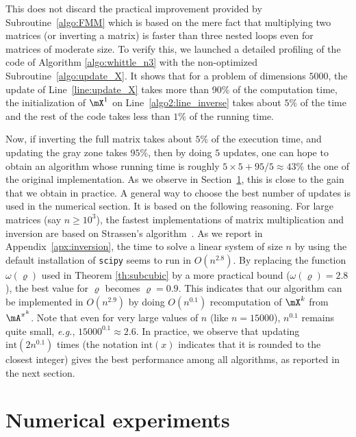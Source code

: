 This does not discard the practical improvement provided by Subroutine~\ref{algo:FMM} which is based on the mere fact that multiplying  two matrices (or inverting a matrix) is faster than three nested loops even for matrices of moderate size. To verify this, we launched  a detailed profiling of the code of Algorithm \ref{algo:whittle_n3} with the non-optimized Subroutine~\ref{algo:update_X}. It shows that for a problem of dimensions $5000$, the update of Line~\ref{line:update_X} takes more than 90\% of the computation time, the initialization of $\mX^1$ on Line~\ref{algo2:line_inverse} takes about $5\%$ of the time and the rest of the code takes less than $1\%$ of the running time.

Now, if inverting the full matrix takes about $5\%$ of the execution time, and updating the gray zone takes $95\%$, then by doing $5$ updates, one can hope to obtain an algorithm whose running time is roughly $5\times5 + 95/5\approx43\%$ the one of the original implementation. As we observe in Section~\ref{sec:numerical}, this is close to the gain that we obtain in practice. A general way to choose the best number of updates is used in the numerical section. It is based on the following reasoning. For large matrices (say $n\ge 10^3$), the fastest implementations of matrix multiplication and inversion are based on Strassen's algorithm~\cite{huang2016strassen,huang2018practical}. As we report in Appendix~\ref{apx:inversion}, the time to solve a linear system of size $n$ by using the default installation of \texttt{scipy} seems to run in $O(n^{2.8})$. By replacing the function $\omega(\varrho)$ used in Theorem \ref{th:subcubic} by a more practical bound ($\omega(\varrho)=2.8$), the best value for $\varrho$ becomes $\varrho = 0.9$. This indicates that our algorithm can be implemented in $O(n^{2.9})$ by doing $O(n^{0.1})$ recomputation of $\mX^k$ from $\mA^{\pi^k}$. Note that even for very large values of $n$ (like $n=15000$), $n^{0.1}$ remains quite small, \emph{e.g.}, $15000^{0.1}\approx 2.6$. In practice, we observe that updating $\mathrm{int}(2n^{0.1})$ times (the notation $\mathrm{int}(x)$ indicates that it is rounded to the closest integer) gives the best performance among all algorithms, as reported in the next section.



\section{Numerical experiments}
\label{sec:numerical}

